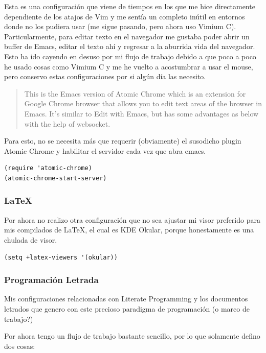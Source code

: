 \documentclass[11pt]{article}
\begin{document}
Esta es una configuración que viene de tiempos en los que me hice directamente dependiente de los atajos de Vim y me sentía un completo inútil en entornos donde no los pudiera usar (me sigue pasando, pero ahora uso Vimium C). Particularmente, para editar texto en el navegador me gustaba poder abrir un buffer de Emacs, editar el texto ahí y regresar a la aburrida vida del navegador. Esto ha ido cayendo en desuso por mi flujo de trabajo debido a que poco a poco he usado cosas como Vimium C y me he vuelto a acostumbrar a usar el mouse, pero conservo estas configuraciones por si algún día las necesito.

\begin{quote}
This is the Emacs version of Atomic Chrome which is an extension for Google Chrome browser that allows you to edit text areas of the browser in Emacs. It's similar to Edit with Emacs, but has some advantages as below with the help of websocket.
\end{quote}

Para esto, no se necesita más que requerir (obviamente) el susodicho plugin Atomic Chrome y habilitar el servidor cada vez que abra emacs.

\begin{verbatim}
(require 'atomic-chrome)
(atomic-chrome-start-server)
\end{verbatim}
\subsubsection{\LaTeX{}}
\label{sec:org2ca2909}

Por ahora no realizo otra configuración que no sea ajustar mi visor preferido para mis compilados de \LaTeX{}, el cual es KDE Okular, porque honestamente es una chulada de visor.

\begin{verbatim}
(setq +latex-viewers '(okular))
\end{verbatim}
\subsubsection{Programación Letrada}
\label{sec:orgaa1e73a}

Mis configuraciones relacionadas con Literate Programming y los documentos letrados que genero con este precioso paradigma de programación (o marco de trabajo?)

Por ahora tengo un flujo de trabajo bastante sencillo, por lo que solamente defino dos cosas:
\end{document}
